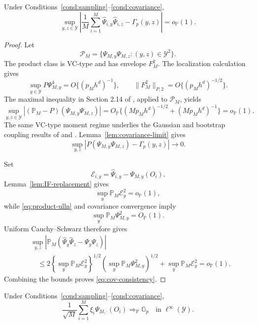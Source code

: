\begin{lemma}
\label{lem:cov-estimation}
Under Conditions~\ref{cond:sampling}--\ref{cond:covariance},
\begin{equation}
\sup_{y,z\in\mathcal Y}
\left|
\frac1M\sum_{i=1}^M
\widehat\Psi_{i,y}\widehat\Psi_{i,z}
-
\Gamma_p(y,z)
\right|
=o_{\mathbb P}(1).
\label{eq:cov-consistency}
\end{equation}
\end{lemma}

\begin{proof}
Let
\[
\mathcal P_M
=
\{\Psi_{M,y}\Psi_{M,z}:(y,z)\in\mathcal Y^2\}.
\]
The product class is VC-type and has envelope \(F_M^2\). The localization calculation gives
\begin{equation}
\sup_{y\in\mathcal Y}P\Psi_{M,y}^4
=O\{(p_Mh^d)^{-1}\},
\qquad
\|F_M^2\|_{P,2}
=O\{(p_Mh^d)^{-1/2}\}.
\label{eq:product-moment}
\end{equation}
The maximal inequality in Section 2.14 of \citet{VanderVaartWellner1996}, applied to \(\mathcal P_M\), yields
\begin{equation}
\sup_{y,z\in\mathcal Y}
|(\mathbb P_M-P)(\Psi_{M,y}\Psi_{M,z})|
=
O_{\mathbb P}\{(Mp_Mh^d)^{-1/2}+(Mp_Mh^d)^{-1}\}
=o_{\mathbb P}(1).
\label{eq:product-ulln}
\end{equation}
The same VC-type moment regime underlies the Gaussian and bootstrap coupling results of \citet{ChernozhukovChetverikovKato2014} and \citet{ChernozhukovChetverikovKato2016}. Lemma~\ref{lem:covariance-limit} gives
\[
\sup_{y,z}|P(\Psi_{M,y}\Psi_{M,z})-\Gamma_p(y,z)|
\to0.
\]

Set
\[
\mathcal E_{i,y}
=
\widehat\Psi_{i,y}-\Psi_{M,y}(O_i).
\]
Lemma~\ref{lem:IF-replacement} gives
\[
\sup_y\mathbb P_M\mathcal E_y^2=o_{\mathbb P}(1),
\]
while \eqref{eq:product-ulln} and covariance convergence imply
\[
\sup_y\mathbb P_M\Psi_{M,y}^2=O_{\mathbb P}(1).
\]
Uniform Cauchy--Schwarz therefore gives
\begin{align*}
&\sup_{y,z}
\left|
\mathbb P_M(\widehat\Psi_y\widehat\Psi_z-\Psi_y\Psi_z)
\right|\\
&\quad\le
2\left\{\sup_y\mathbb P_M\mathcal E_y^2\right\}^{1/2}
 \left(\sup_y\mathbb P_M\Psi_{M,y}^2\right)^{1/2}
+\sup_y\mathbb P_M\mathcal E_y^2
=o_{\mathbb P}(1).
\end{align*}
Combining the bounds proves \eqref{eq:cov-consistency}.
\end{proof}

\begin{lemma}
\label{lem:multiplier-clt}
Under Conditions~\ref{cond:sampling}--\ref{cond:covariance},
\[
\frac1{\sqrt M}
\sum_{i=1}^M\xi_i\Psi_{M,\cdot}(O_i)
\Rightarrow_{\mathbb P}
\mathbb G_p
\quad\text{in }\ell^\infty(\mathcal Y).
\]
\end{lemma}

